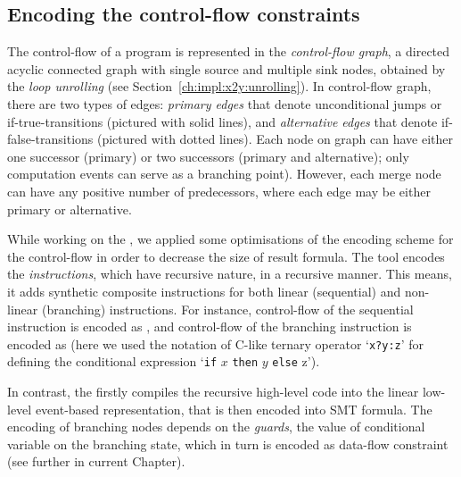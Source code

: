 \subsection{Encoding the control-flow constraints}
\label{ch:port:enc:cf}

The control-flow of a program is represented in the \textit{control-flow graph}, a directed acyclic connected graph with single source and multiple sink nodes, obtained by the \textit{loop unrolling} (see Section~\ref{ch:impl:x2y:unrolling}).%
In control-flow graph, there are two types of edges: \textit{primary edges} that denote unconditional jumps or if-true-transitions (pictured with solid lines), and \textit{alternative edges} that denote if-false-transitions (pictured with dotted lines). Each node on graph can have either one successor (primary) or two successors (primary and alternative); only computation events can serve as a branching point). However, each merge node can have any positive number of predecessors, where each edge may be either primary or alternative.

While working on the , we applied some optimisations of the encoding scheme for the control-flow in order to decrease the size of result formula. 
The  tool encodes the \textit{instructions}, which have recursive nature, in a recursive manner. This means, it adds synthetic composite instructions for both linear (sequential) and non-linear (branching) instructions. 
For instance, control-flow of the sequential instruction  is encoded as 
, 
and control-flow of the branching instruction  is encoded as 
 (here we used the notation of C-like ternary operator `\texttt{x?y:z}' for defining the conditional expression `\texttt{if} $x$ \texttt{then} $y$ \texttt{else} z').

In contrast, the  firstly compiles the recursive high-level code into the linear low-level event-based representation,
that is then encoded into SMT formula. The encoding of branching nodes depends on the \textit{guards}, the value of conditional variable on the branching state, which in turn is encoded as data-flow constraint (see further in current Chapter).

